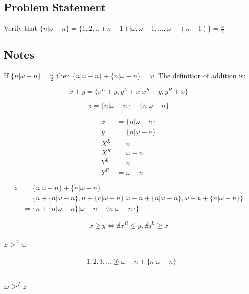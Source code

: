 \subsection*{Problem Statement}
Verify that $\{n|\omega - n\} = \{1, 2, ... (n - 1)|\omega, \omega - 1, ..., \omega - (n - 1)\}=\frac{\omega}{2}$
\subsection*{Notes}
If $\{n|\omega - n\}=\frac{\omega}{2}$ then $\{n|\omega - n\} + \{n|\omega - n\}=\omega$.  The definition of addition is:

\begin{equation*}
    x + y = \{x^L + y, y^L + x | x^R + y, y^R + x\}
\end{equation*}

\begin{equation*}
    z = \{n|\omega - n\} + \{n|\omega - n\}
\end{equation*}

\begin{align*}
    x &= \{n|\omega - n\} \\
    y &= \{n|\omega - n\} \\
    X^L &= n \\
    X^R &= \omega - n \\
    Y^L &= n \\
    Y^R &= \omega - n
\end{align*}

\begin{align*}
    z &= \{n|\omega - n\} + \{n|\omega - n\} \\
    &= \{n + \{n|\omega - n\}, n + \{n|\omega - n\} | \omega - n + \{n|\omega - n\}, \omega - n + \{n|\omega - n\}\} \\
    &= \{n + \{n|\omega - n\} | \omega - n + \{n|\omega - n\}\}
\end{align*}

\begin{equation*}
    x \geqslant y \Leftrightarrow \nexists x^R \leq y, \nexists y^L \geq x
\end{equation*}

\subsubsection*{$z \ge^? \omega$}

\begin{align*}
    &1, 2, 3, ... \ngeqslant \omega - n + \{n|\omega - n\} \\
    &
\end{align*}

\subsubsection*{$\omega \ge^? z$}